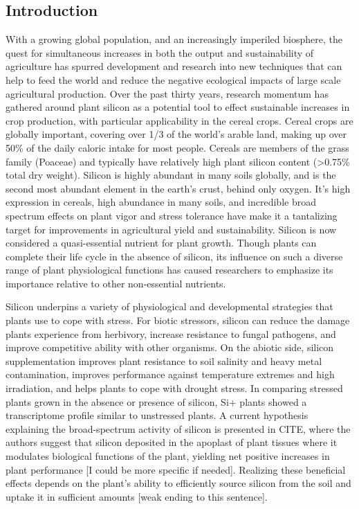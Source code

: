 \documentclass[12pt, letterpaper, ]{article}
\begin{document}
\subsection{Introduction}
With a growing global population, and an increasingly imperiled biosphere, the quest for simultaneous increases in both the output and sustainability of agriculture has spurred development and research into new techniques that can help to feed the world and reduce the negative ecological impacts of large scale agricultural production. Over the past thirty years, research momentum has gathered around plant silicon as a potential tool to effect sustainable increases in crop production, with particular applicability in the cereal crops. Cereal crops are globally important, covering over 1/3 of the world’s arable land, making up over 50\% of the daily caloric intake for most people. Cereals are members of the grass family (Poaceae) and typically have relatively high plant silicon content (>0.75\% total dry weight). Silicon is highly abundant in many soils globally, and is the second most abundant element in the earth’s crust, behind only oxygen. It’s high expression in cereals, high abundance in many soils, and incredible broad spectrum effects on plant vigor and stress tolerance have make it a tantalizing target for improvements in agricultural yield and sustainability. 
Silicon is now considered a quasi-essential nutrient for plant growth. Though plants can complete their life cycle in the absence of silicon, its influence on such a diverse range of plant physiological functions has caused researchers to emphasize its importance relative to other non-essential nutrients. 

Silicon underpins a variety of physiological and developmental strategies that plants use to cope with stress. For biotic stressors, silicon can reduce the damage plants experience from herbivory, increase resistance to fungal pathogens, and improve competitive ability with other organisms. On the abiotic side, silicon supplementation improves plant resistance to soil salinity and heavy metal contamination, improves performance against temperature extremes and high irradiation, and helps plants to cope with drought stress. In comparing stressed plants grown in the absence or presence of silicon, Si+ plants showed a transcriptome profile similar to unstressed plants. A current hypothesis explaining the broad-spectrum activity of silicon is presented in {CITE}, where the authors suggest that silicon deposited in the apoplast of plant tissues where it modulates biological functions of the plant, yielding net positive increases in plant performance [I could be more specific if needed]. Realizing these beneficial effects depends on the plant’s ability to efficiently source silicon from the soil and uptake it in sufficient amounts [weak ending to this sentence]. 
\end{document}
